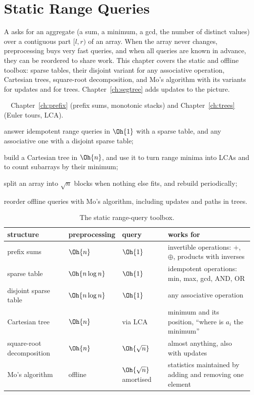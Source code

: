 \chapter{Static Range Queries}\label{ch:static}

A  asks for an aggregate (a sum, a minimum, a gcd, the number of distinct values) over a contiguous part $[l, r)$
of an array. When the array never changes, preprocessing buys very fast queries, and when all queries are known in advance, they can
be reordered to share work. This chapter covers the static and offline toolbox: sparse tables, their disjoint variant for any
associative operation, Cartesian trees, square-root decomposition, and Mo's algorithm with its variants for updates and for trees.
Chapter~\ref{ch:segtree} adds updates to the picture.

\begin{chapterintro}{\gold\ \plat\ \ioi}{Chapter~\ref{ch:prefix} (prefix sums, monotonic stacks) and Chapter~\ref{ch:trees}
(Euler tours, LCA).}
  \item answer idempotent range queries in $\Oh{1}$ with a sparse table, and any associative one with a disjoint sparse table;
  \item build a Cartesian tree in $\Oh{n}$, and use it to turn range minima into LCAs and to count subarrays by their minimum;
  \item split an array into $\sqrt n$ blocks when nothing else fits, and rebuild periodically;
  \item reorder offline queries with Mo's algorithm, including updates and paths in trees.
\end{chapterintro}

\begin{table}[htbp]
\centering\small
\begin{tabularx}{\linewidth}{@{}>{\raggedright\arraybackslash}p{3.6cm}>{\raggedright\arraybackslash}p{2.6cm}>{\raggedright\arraybackslash}p{2.9cm}X@{}}
\toprule
structure & preprocessing & query & works for \\
\midrule
prefix sums & $\Oh{n}$ & $\Oh{1}$ & invertible operations: $+$, $\oplus$, products with inverses \\
sparse table & $\Oh{n \log n}$ & $\Oh{1}$ & idempotent operations: min, max, gcd, AND, OR \\
disjoint sparse table & $\Oh{n \log n}$ & $\Oh{1}$ & any associative operation \\
Cartesian tree & $\Oh{n}$ & via LCA & minimum and its position, ``where is $a_i$ the minimum'' \\
square-root decomposition & $\Oh{n}$ & $\Oh{\sqrt n}$ & almost anything, also with updates \\
Mo's algorithm & offline & $\Oh{\sqrt n}$ amortised & statistics maintained by adding and removing one element \\
\bottomrule
\end{tabularx}
\caption{The static range-query toolbox.}
\label{tab:static}
\end{table}

